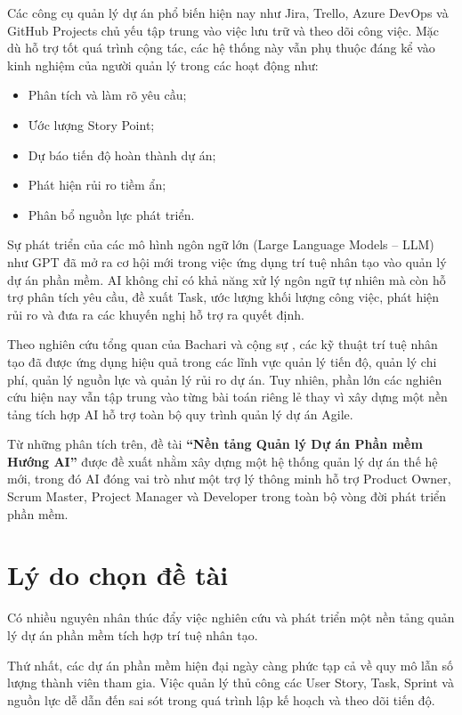 \documentclass[12pt,a4paper]{report}
\begin{document}
Các công cụ quản lý dự án phổ biến hiện nay như Jira, Trello, Azure DevOps và GitHub Projects chủ yếu tập trung vào việc lưu trữ và theo dõi công việc. Mặc dù hỗ trợ tốt quá trình cộng tác, các hệ thống này vẫn phụ thuộc đáng kể vào kinh nghiệm của người quản lý trong các hoạt động như:

\begin{itemize}
\item Phân tích và làm rõ yêu cầu;
\item Ước lượng Story Point;
\item Dự báo tiến độ hoàn thành dự án;
\item Phát hiện rủi ro tiềm ẩn;
\item Phân bổ nguồn lực phát triển.
\end{itemize}

Sự phát triển của các mô hình ngôn ngữ lớn (Large Language Models -- LLM) như GPT đã mở ra cơ hội mới trong việc ứng dụng trí tuệ nhân tạo vào quản lý dự án phần mềm. AI không chỉ có khả năng xử lý ngôn ngữ tự nhiên mà còn hỗ trợ phân tích yêu cầu, đề xuất Task, ước lượng khối lượng công việc, phát hiện rủi ro và đưa ra các khuyến nghị hỗ trợ ra quyết định.

Theo nghiên cứu tổng quan của Bachari và cộng sự \cite{bachari2025}, các kỹ thuật trí tuệ nhân tạo đã được ứng dụng hiệu quả trong các lĩnh vực quản lý tiến độ, quản lý chi phí, quản lý nguồn lực và quản lý rủi ro dự án. Tuy nhiên, phần lớn các nghiên cứu hiện nay vẫn tập trung vào từng bài toán riêng lẻ thay vì xây dựng một nền tảng tích hợp AI hỗ trợ toàn bộ quy trình quản lý dự án Agile.

Từ những phân tích trên, đề tài \textbf{``Nền tảng Quản lý Dự án Phần mềm Hướng AI''} được đề xuất nhằm xây dựng một hệ thống quản lý dự án thế hệ mới, trong đó AI đóng vai trò như một trợ lý thông minh hỗ trợ Product Owner, Scrum Master, Project Manager và Developer trong toàn bộ vòng đời phát triển phần mềm.

\section{Lý do chọn đề tài}
Có nhiều nguyên nhân thúc đẩy việc nghiên cứu và phát triển một nền tảng quản lý dự án phần mềm tích hợp trí tuệ nhân tạo.

Thứ nhất, các dự án phần mềm hiện đại ngày càng phức tạp cả về quy mô lẫn số lượng thành viên tham gia. Việc quản lý thủ công các User Story, Task, Sprint và nguồn lực dễ dẫn đến sai sót trong quá trình lập kế hoạch và theo dõi tiến độ.
\end{document}
